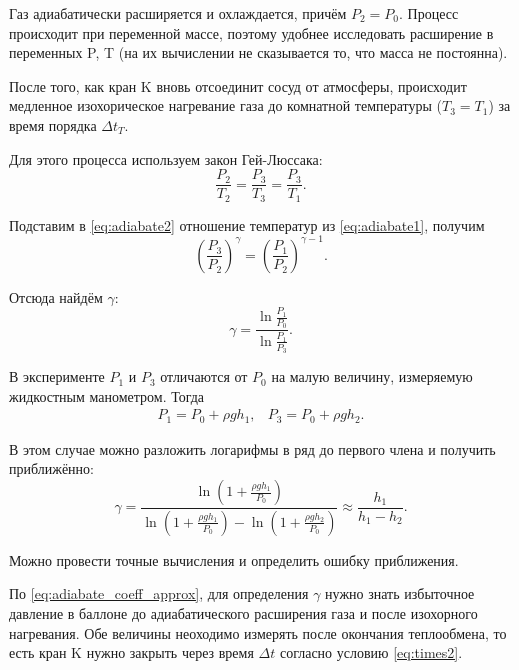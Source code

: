 \documentclass[12pt]{article}
\begin{document}
	Газ адиабатически расширяется и охлаждается, причём $P_2=P_0$. Процесс происходит при переменной массе, поэтому удобнее исследовать расширение в переменных P, T (на их вычислении не сказывается то, что масса не постоянна).
	
	После того, как кран K вновь отсоединит сосуд от атмосферы, происходит медленное изохорическое нагревание газа до комнатной температуры ($T_3=T_1$) за время порядка $\Delta t_T$.
	
	Для этого процесса используем закон Гей-Люссака:
	\begin{equation}
	\label{eq:adiabate2}
	\frac{P_2}{T_2}=\frac{P_3}{T_3}=\frac{P_3}{T_1}.
	\end{equation}
	
	Подставим в \eqref{eq:adiabate2} отношение температур из \eqref{eq:adiabate1}, получим
	\begin{equation}
	\label{eq:adiabate3}
	\left( \frac{P_3}{P_2} \right)^\gamma=\left( \frac{P_1}{P_2} \right)^{\gamma-1}.
	\end{equation}
	
	Отсюда найдём $\gamma$:
	\begin{equation}
	\label{eq:adiabate_coeff}
	\gamma=\frac{\ln \frac{P_1}{P_0}}{\ln \frac{P_1}{P_3}}.
	\end{equation}
	
	В эксперименте $P_1$ и $P_3$ отличаются от $P_0$ на малую величину, измеряемую жидкостным манометром. Тогда
	$$
	\begin{array}{cc}
	P_1=P_0+\rho gh_1,&P_3=P_0+\rho gh_2.
	\end{array}
	$$
	
	В этом случае можно разложить логарифмы в ряд до первого члена и получить приближённо:
	\begin{equation}
	\label{eq:adiabate_coeff_approx}
	\gamma=\frac{\ln \left( 1+\frac{\rho gh_1}{P_0} \right)}{\ln \left( 1+\frac{\rho gh_1}{P_0} \right) - \ln \left( 1+\frac{\rho gh_2}{P_0} \right)} \approx \frac{h_1}{h_1-h_2}.
	\end{equation}
	
	Можно провести точные вычисления и определить ошибку приближения.
	
	По \eqref{eq:adiabate_coeff_approx}, для определения $\gamma$ нужно знать избыточное давление в баллоне до адиабатического расширения газа и после изохорного нагревания. Обе величины неоходимо измерять после окончания теплообмена, то есть кран K нужно закрыть через время $\Delta t$ согласно условию \eqref{eq:times2}.
	
\end{document}
